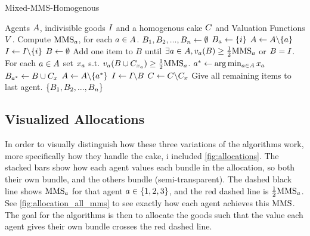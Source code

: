 \begin{algorithm}
    \caption{Mixed-MMS-Homogenous}\label{alg:mixed}
    \begin{algorithmic}[1]
        \Require Agents $A$, indivisible goods $I$ and a homogenous cake $C$ and Valuation Functions $V$.
        \State Compute $\text{MMS}_a$, for each $a\in A$.
        \State $B_1, B_2, ...,B_n\gets\emptyset$
        \label{line:mixed-phase1}
            \State $B_a\gets\{i\}$
            \State $A\gets A\backslash\{a\}$
            \State $I\gets I\backslash\{i\}$
        \EndWhile
        \label{line:mixed-phase2}
            \State $B\gets\emptyset$
            \State Add one item to $B$ until $\exists a\in A,v_a(B) \geq\frac{1}{2}\text{MMS}_a$ or $B=I$.
            \State For each $a\in A$ set $x_a$ s.t. $v_a(B\cup C_{x_a}) \geq \frac{1}{2}\text{MMS}_a$.
            \State $a^*\gets\arg\min_{a\in A}x_a$
            \State $B_{a^*}\gets B\cup C_x$
            \State $A\gets A\backslash\{a^*\}$
            \State $I\gets I\backslash B$
            \State $C\gets C\backslash C_x$
        \EndWhile
        \State Give all remaining items to last agent.\label{line:mixed-phase3}
        \State \Return $\{B_1, B_2, ...,B_n\}$
    \end{algorithmic}
\end{algorithm}





\subsection{Visualized Allocations}

In order to visually distinguish how these three variations of the algorithms work, more specifically how they handle the cake, i included \autoref{fig:allocations}. The stacked bars show how each agent values each bundle in the allocation, so both their own bundle, and the others bundle (semi-transparent). The dashed black line shows $\text{MMS}_a$ for that agent $a\in\{1,2,3\}$, and the red dashed line is $\frac{1}{2}\text{MMS}_a$. See \autoref{fig:allocation_all_mms} to see exactly how each agent achieves this $\text{MMS}$. The goal for the algorithms is then to allocate the goods such that the value each agent gives their own bundle crosses the red dashed line.

